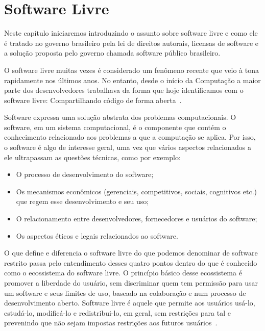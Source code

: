 \chapter[Software Livre]{Software Livre}
\label{software_livre}

Neste capítulo iniciaremos introduzindo o assunto sobre software livre e como ele é
tratado no governo brasileiro pela lei de direitos autorais, licensas de software e 
a solução proposta pelo governo chamada software público brasileiro. 

O software livre muitas vezes é considerado um fenômeno recente que veio à tona
rapidamente nos últimos anos. No entanto, desde o início da Computação a maior parte
dos desenvolvedores trabalhava da forma que hoje identificamos com o software livre:
Compartilhando código de forma aberta~\cite{kon2012software}.

Software expressa uma solução abstrata dos problemas computacionais. O software, em um
sistema computacional, é o componente que contém o conhecimento relacionado aos problemas a
que a computação se aplica. Por isso, o software é algo de interesse geral, uma vez que vários
aspectos relacionados a ele ultrapassam as questões técnicas, como por exemplo:

\begin{itemize}

\item O processo de desenvolvimento do software;

\item Os mecanismos econômicos (gerenciais, competitivos, sociais, cognitivos etc.) que regem esse
desenvolvimento e seu uso;

\item O relacionamento entre desenvolvedores, fornecedores e usuários do software;

\item Os aspectos éticos e legais relacionados ao software.

\end{itemize}

O que define e diferencia o software livre do que podemos denominar de software restrito passa
pelo entendimento desses quatro pontos dentro do que é conhecido como o ecossistema do 
software livre. O princípio básico desse ecossistema é promover a liberdade do 
usuário, sem discriminar quem tem permissão para usar um software e seus limites 
de uso, baseado na colaboração e num processo de desenvolvimento aberto. Software 
livre é aquele que permite aos usuários usá-lo, estudá-lo, modificá-lo e redistribui-lo, 
em geral, sem restrições para tal e prevenindo que não sejam impostas restrições aos 
futuros usuários~\cite{meirelles2013metrics}.

